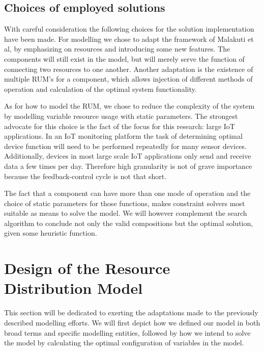 \subsection{Choices of employed solutions}
\label{sub:choices}
With careful consideration the following choices for the solution implementation have been made. For modelling we chose to adapt the framework of Malakuti et al\cite{steven_te_brinke}, by emphasizing on resources and introducing some new features. The components will still exist in the model, but will merely serve the function of connecting two resources to one another. Another adaptation is the existence of multiple RUM's for a component, which allows injection of different methods of operation and calculation of the optimal system functionality.

As for how to model the RUM, we chose to reduce the complexity of the system by modelling variable resource usage with static parameters. The strongest advocate for this choice is the fact of the focus for this research: large IoT applications. In an IoT monitoring platform the task of determining optimal device function will need to be performed repeatedly for many sensor devices. Additionally, devices in most large scale IoT applications  only send and receive data a few times per day\cite{refs over size zoeken}. Therefore high granularity is not of grave importance because the feedback-control cycle is not that short. 

The fact that a component can have more than one mode of operation and the choice of static parameters for those functions, makes constraint solvers most suitable as means to solve the model. We will however complement the search algorithm to conclude not only the valid compositions but the optimal solution, given some heuristic function.

\section{Design of the Resource Distribution Model}
This section will be dedicated to exerting the adaptations made to the previously described modelling efforts. We will first depict how we defined our model in both broad terms and specific modelling entities, followed by how we intend to solve the model by calculating the optimal configuration of variables in the model.
